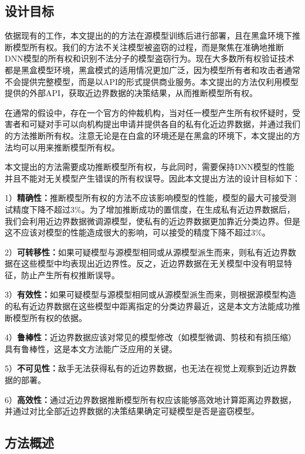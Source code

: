 \subsection{设计目标}

依据现有的工作，本文提出的的方法在源模型训练后进行部署，且在黑盒环境下推断模型所有权。我们的方法不关注模型被盗窃的过程，而是聚焦在准确地推断DNN模型的所有权和识别不法分子的模型盗窃行为。现在大多数所有权验证技术都是黑盒模型环境，黑盒模式的适用情况更加广泛，因为模型所有者和攻击者通常不会提供完整模型，而是以API的形式提供商业服务。本文提出的方法仅利用模型提供的外部API，获取近边界数据的决策结果，从而推断模型所有权。

在通常的假设中，存在一个官方的仲裁机构，当对任一模型产生所有权怀疑时，受害者和可疑对手可以向机构提出申请并提供各自的私有化近边界数据，并通过我们的方法推断所有权。注意无论是在白盒的环境还是在黑盒的环境下，本文提出的方法均可以用来推断模型所有权。

本文提出的方法需要成功推断模型所有权，与此同时，需要保持DNN模型的性能并且不能对无关模型产生错误的所有权误导。因此本文提出方法的设计目标如下：

1）\textbf{精确性：}推断模型所有权的方法不应该影响模型的性能，模型的最大可接受测试精度下降不超过3\%。为了增加推断成功的置信度，在生成私有近边界数据后，我们会利用近边界数据微调源模型，使私有的近边界数据更加靠近分类边界。但是这不应该对模型的性能造成很大的影响，可以接受的精度下降不超过3\%。

2）\textbf{可转移性：}如果可疑模型与源模型相同或从源模型派生而来，则私有近边界数据在这些模型中均表现出近边界性。反之，近边界数据在无关模型中没有明显特征，防止产生所有权推断误导。

3）\textbf{有效性：}如果可疑模型与源模型相同或从源模型派生而来，则根据源模型构造的私有近边界数据在这些模型中距离指定的分类边界最近，这是本文方法能成功推断模型所有权的依据。

4）\textbf{鲁棒性：}近边界数据应该对常见的模型修改（如模型微调、剪枝和有损压缩）具有鲁棒性，这是本文方法能广泛应用的关键。

5）\textbf{不可见性：}敌手无法获得私有的近边界数据，也无法在视觉上观察到近边界数据的部署。

6）\textbf{高效性：}通过近边界数据推断模型所有权应该能够高效地计算距离边界数据，并通过对比全部近边界数据的决策结果确定可疑模型是否是盗窃模型。


\subsection{方法概述}


